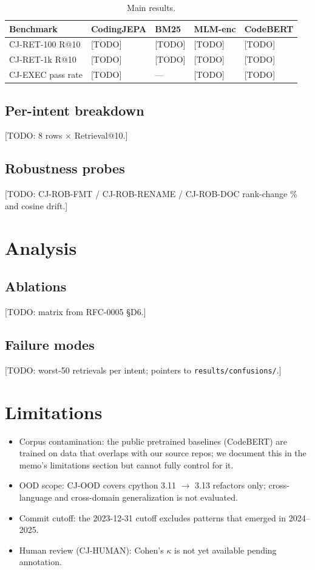 \documentclass[10pt]{article}
\begin{document}
\begin{table}[h]
\centering
\caption{Main results.}
\label{tab:main}
\begin{tabular}{lllll}
\toprule
Benchmark & CodingJEPA & BM25 & MLM-enc & CodeBERT \\
\midrule
CJ-RET-100 R@10 & [TODO] & [TODO] & [TODO] & [TODO] \\
CJ-RET-1k R@10  & [TODO] & [TODO] & [TODO] & [TODO] \\
CJ-EXEC pass rate & [TODO] & --- & [TODO] & [TODO] \\
\bottomrule
\end{tabular}
\end{table}

\subsection{Per-intent breakdown}

[TODO: 8 rows × Retrieval@10.]

\subsection{Robustness probes}

[TODO: CJ-ROB-FMT / CJ-ROB-RENAME / CJ-ROB-DOC rank-change \% and cosine drift.]

\section{Analysis}
\label{sec:analysis}

\subsection{Ablations}

[TODO: matrix from RFC-0005 §D6.]

\subsection{Failure modes}

[TODO: worst-50 retrievals per intent; pointers to \texttt{results/confusions/}.]

\section{Limitations}
\label{sec:limitations}

\begin{itemize}
  \item Corpus contamination: the public pretrained baselines (CodeBERT) are trained on
        data that overlaps with our source repos; we document this in the memo's limitations
        section but cannot fully control for it.
  \item OOD scope: CJ-OOD covers cpython 3.11 $\to$ 3.13 refactors only; cross-language and
        cross-domain generalization is not evaluated.
  \item Commit cutoff: the 2023-12-31 cutoff excludes patterns that emerged in 2024--2025.
  \item Human review (CJ-HUMAN): Cohen's $\kappa$ is not yet available pending annotation.
\end{itemize}
\end{document}
